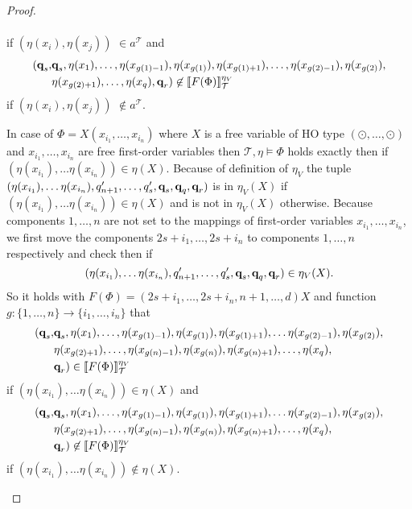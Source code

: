 \begin{proof}
\begin{compactitem}
\begin{align*}
        \end{align*}
        if $(\eta(x_i), \eta(x_j))$ $ \in a^\mathcal{T}$ and
        \begin{align*}
            (\emph{q}_s, &\emph{q}_s, \eta(x_1), \dots, \eta(x_{g(1) - 1}), \eta(x_{g(1)}), \eta(x_{g(1)+1}), \dots, \eta(x_{g(2)-1}), \eta
            (x_{g(2)}),\\& \eta(x_{g(2)+1}), \dots, \eta(x_q), \emph{q}_r) \not\in \llbracket F(\Phi) \rrbracket^{\eta_V}_\mathcal{T}
        \end{align*}
        if $(\eta(x_i), \eta(x_j))$ $ \not\in a^\mathcal{T}$.

        \item In case of $\Phi = X(x_{i_1}, \dots, x_{i_n})$ where $X$ is a free variable of HO type $(\odot, \dots,
        \odot)$ and $x_{i_1}, \dots, x_{i_n}$ are free first-order variables then $\mathcal{T}, \eta \models \Phi$
        holds exactly then if $(\eta(x_{i_1}), \dots \eta(x_{i_n})) \in \eta(X)$. Because of definition of $\eta_V$ the
        tuple $(\eta(x_{i_1}), \dots \eta(x_{i_n}), q_{n + 1}', \dots, q_{s}', \emph{q}_s, \emph{q}_q, \emph{q}_r)$ is in $
        \eta_V(X)$ if $(\eta(x_{i_1}),\dots \eta(x_{i_n})) \in \eta(X)$ and is not in $\eta_V(X)$ otherwise. Because
         components $1, \dots, n$ are not set to the mappings of first-order variables $x_{i_1}, \dots, x_{i_n}$, we first move the components $2s+i_1, \dots, 2s+i_n$ to components $1, \dots, n$ respectively and check then if
        \[(\eta(x_{i_1}), \dots \eta(x_{i_n}), q_{n + 1}', \dots, q_{s}', \emph{q}_s, \emph{q}_q, \emph{q}_r) \in \eta_V(X).\]
        So it holds with $F(\Phi) = {(2s+i_1, \dots, 2s+i_n, n+1, \dots, d)}X$ and function $g: \{1, \dots, n\}
        \rightarrow \{i_1, \dots, i_n\}$ that
        \begin{align*}
            (\emph{q}_s, &\emph{q}_s, \eta(x_1), \dots, \eta(x_{g(1)-1}), \eta(x_{g(1)}), \eta(x_{g(1)+1}), \dots \eta(x_{g(2)-1}), \eta
            (x_{g(2)}),\\& \eta(x_{g(2)+1}), \dots, \eta(x_{g(n)-1}), \eta(x_{g(n)}), \eta(x_{g(n)+1}), \dots, \eta
            (x_q),\\& \emph{q}_r) \in \llbracket F(\Phi) \rrbracket^{\eta_V
            }_\mathcal{T}
        \end{align*}
        if $(\eta(x_{i_1}), \dots \eta(x_{i_n})) \in \eta(X)$ and
        \begin{align*}
            (\emph{q}_s, &\emph{q}_s, \eta(x_1), \dots, \eta(x_{g(1)-1}), \eta(x_{g(1)}), \eta(x_{g(1)+1}), \dots \eta(x_{g(2)-1}), \eta
            (x_{g(2)}),\\& \eta(x_{g(2)+1}), \dots, \eta(x_{g(n)-1}), \eta(x_{g(n)}), \eta(x_{g(n)+1}), \dots, \eta
            (x_q),\\& \emph{q}_r) \not\in \llbracket F(\Phi) \rrbracket^{\eta_V
            }_\mathcal{T}
        \end{align*}
        if $(\eta(x_{i_1}), \dots \eta(x_{i_n})) \not\in \eta(X)$.


\end{compactitem}
\end{proof}
